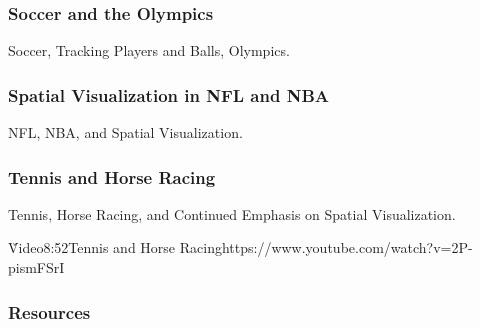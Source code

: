 

\subsubsection{Soccer and the Olympics}\label{soccer-and-the-olympics}

Soccer, Tracking Players and Balls, Olympics.





\subsubsection{Spatial Visualization in NFL and
NBA}\label{spatial-visualization-in-nfl-and-nba}

NFL, NBA, and Spatial Visualization.





\subsubsection{Tennis and Horse Racing}\label{tennis-and-horse-racing}

Tennis, Horse Racing, and Continued Emphasis on Spatial Visualization.


\v Video{8:52}{Tennis and Horse Racing}{https://www.youtube.com/watch?v=2P-pismFSrI}  



\subsubsection{Resources}\label{resources-2}

